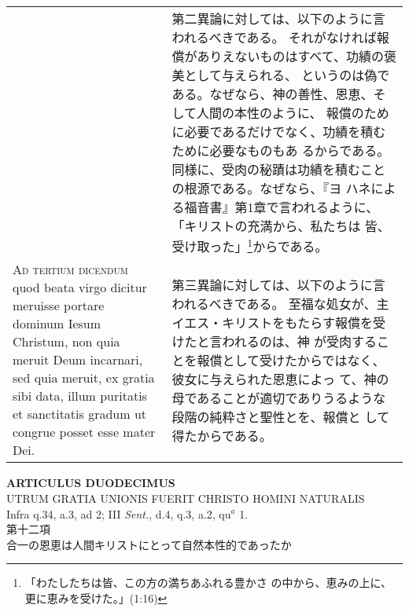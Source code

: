 \documentclass[10pt]{jsarticle} %
\begin{document}
\begin{longtable}{p{21em}p{21em}}
&

第二異論に対しては、以下のように言われるべきである。
それがなければ報償がありえないものはすべて、功績の褒美として与えられる、
 というのは偽である。なぜなら、神の善性、恩恵、そして人間の本性のように、
 報償のために必要であるだけでなく、功績を積むために必要なものもあ
 るからである。同様に、受肉の秘蹟は功績を積むことの根源である。なぜなら、『ヨ
 ハネによる福音書』第1章で言われるように、「キリストの充満から、私たちは
 皆、受け取った」\footnote{「わたしたちは皆、この方の満ちあふれる豊かさ
 の中から、恵みの上に、更に恵みを受けた。」(1:16)}からである。


\\



{\scshape Ad tertium dicendum} quod beata virgo dicitur meruisse portare dominum
Iesum Christum, non quia meruit Deum incarnari, sed quia meruit, ex
gratia sibi data, illum puritatis et sanctitatis gradum ut congrue
posset esse mater Dei.


&


第三異論に対しては、以下のように言われるべきである。
至福な処女が、主イエス・キリストをもたらす報償を受けたと言われるのは、神
 が受肉することを報償として受けたからではなく、彼女に与えられた恩恵によっ
 て、神の母であることが適切でありうるような段階の純粋さと聖性とを、報償と
 して得たからである。

\\


\end{longtable}
\newpage




\begin{center}
 {\Large {\bf ARTICULUS DUODECIMUS}}\\
 {\large UTRUM GRATIA UNIONIS FUERIT CHRISTO HOMINI NATURALIS}\\
 {\footnotesize Infra q.34, a.3, ad 2; III {\itshape Sent.}, d.4, q.3,
 a.2, qu$^a$ 1.}\\
 {\Large 第十二項\\合一の恩恵は人間キリストにとって自然本性的であったか}
\end{center}
\end{document}
